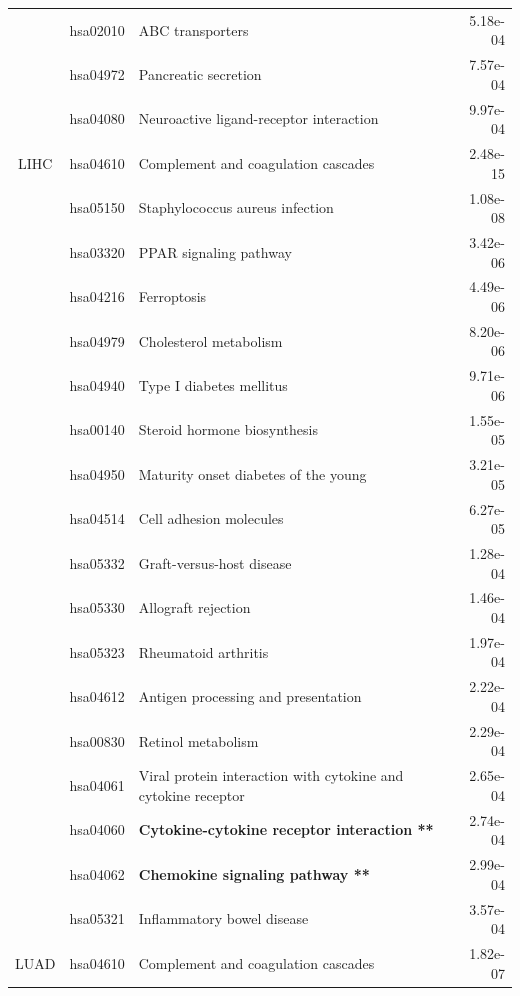 \begin{longtable}{cllr}
 & hsa02010 & \textcolor{\clrnew}{ABC transporters} & 5.18e-04 \\ 
 & hsa04972 & \textcolor{\clrnew}{Pancreatic secretion} & 7.57e-04 \\ 
 & hsa04080 & \textcolor{\clrnew}{Neuroactive ligand-receptor interaction} & 9.97e-04 \\ 
\midrule 
\rowcolor{\clrmatch}LIHC & hsa04610 & Complement and coagulation cascades & 2.48e-15\\ 
 \rowcolor{\clrmatch}& hsa05150 & Staphylococcus aureus infection & 1.08e-08 \\ 
 & hsa03320 & \textcolor{\clrnew}{PPAR signaling pathway} & 3.42e-06 \\ 
 & hsa04216 & \textcolor{\clrnew}{Ferroptosis} & 4.49e-06 \\ 
 & hsa04979 & \textcolor{\clrnew}{Cholesterol metabolism} & 8.20e-06 \\ 
 & hsa04940 & \textcolor{\clrnew}{Type I diabetes mellitus} & 9.71e-06 \\ 
 & hsa00140 & \textcolor{\clrnew}{Steroid hormone biosynthesis} & 1.55e-05 \\ 
 & hsa04950 & \textcolor{\clrnew}{Maturity onset diabetes of the young} & 3.21e-05 \\ 
 & hsa04514 & \textcolor{\clrnew}{Cell adhesion molecules} & 6.27e-05 \\ 
 & hsa05332 & \textcolor{\clrnew}{Graft-versus-host disease} & 1.28e-04 \\ 
 & hsa05330 & \textcolor{\clrnew}{Allograft rejection} & 1.46e-04 \\ 
 & hsa05323 & \textcolor{\clrnew}{Rheumatoid arthritis} & 1.97e-04 \\ 
 & hsa04612 & \textcolor{\clrnew}{Antigen processing and presentation} & 2.22e-04 \\ 
 \rowcolor{\clrmatch}& hsa00830 & Retinol metabolism & 2.29e-04 \\ 
 & hsa04061 & \textcolor{\clrnew}{Viral protein interaction with cytokine and cytokine receptor} & 2.65e-04 \\ 
 \rowcolor{\clrpath}& hsa04060 & \textbf{Cytokine-cytokine receptor interaction **} & 2.74e-04 \\ 
 \rowcolor{\clrpath}& hsa04062 & \textbf{Chemokine signaling pathway **} & 2.99e-04 \\ 
 & hsa05321 & \textcolor{\clrnew}{Inflammatory bowel disease} & 3.57e-04 \\ 
\midrule 
LUAD & hsa04610 & \textcolor{\clrnew}{Complement and coagulation cascades} & 1.82e-07\\ 

\end{longtable}
